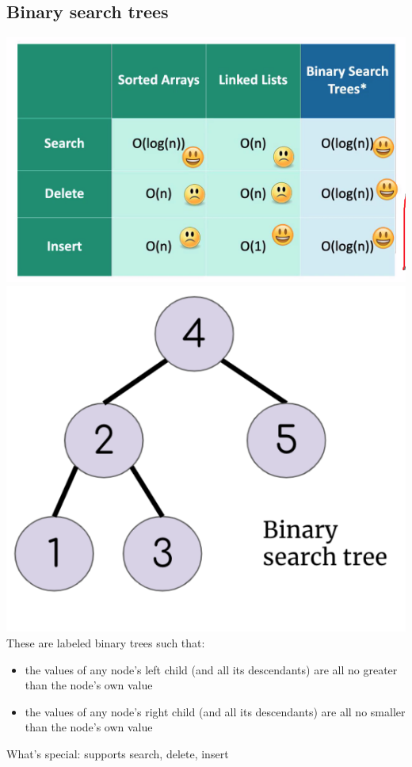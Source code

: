 \documentclass[12pt]{article}
\begin{document}
\subsection*{Binary search trees}
\includegraphics[scale=0.5]{bst.png} 
\includegraphics[scale=0.5]{smallbst.png} 
\\ These are labeled binary trees such that:
\begin{itemize}
    \item the values of any node's left child (and all its descendants) are all no greater than the node's own value
    \item the values of any node's right child (and all its descendants) are all no smaller than the node's own value
\end{itemize}
What's special: supports search, delete, insert
\end{document}
